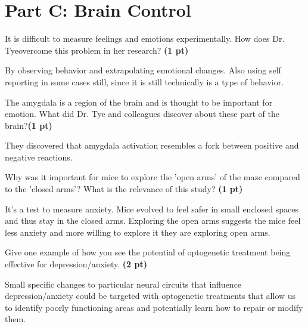 \documentclass[12pt,a4paper]{article}
\begin{document}
\section*{Part C: Brain Control}
\begin{enumerate}[font=\bfseries, wide, resume]
    {\color{under}\item It is difficult to measure feelings and emotions experimentally. How does Dr. Tyeovercome this problem in her research? \textbf{(1 pt)}}

    By observing behavior and extrapolating emotional changes. Also using self reporting in some cases still, since it is still technically is a type of behavior.

    {\color{under}\item The amygdala is a region of the brain and is thought to be important for emotion. What did Dr. Tye and colleagues discover about these part of the brain?\textbf{(1 pt)}}


    They discovered that amygdala activation resembles a fork between positive and negative reactions.

    
    
    {\color{under}\item Why was it important for mice to explore the 'open arms' of the maze compared to the 'closed arms'? What is the relevance of this study? \textbf{(1 pt)}}

     It's a test to measure anxiety. Mice evolved to feel safer in small enclosed spaces and thus stay in the closed arms. Exploring the open arms suggests the mice feel less anxiety and more willing to explore it they are exploring open arms.

    {\color{under}\item Give one example of how you see the potential of optogenetic treatment being effective for depression/anxiety. \textbf{(2 pt)}}

    Small specific changes to particular neural circuits that influence depression/anxiety could be targeted with optogenetic treatments that allow us to identify poorly functioning areas and potentially learn how to repair or modify them.
\end{enumerate}
\end{document}
